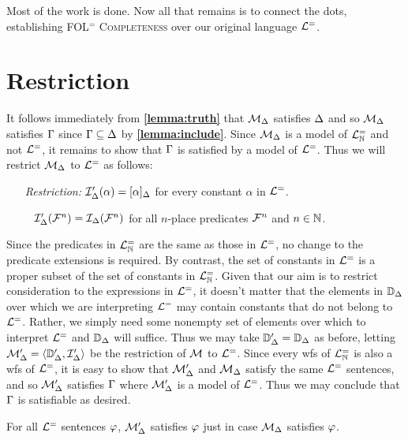 Most of the work is done.
Now all that remains is to connect the dots, establishing \textsc{FOL$^=$ Completeness} over our original language $\mathcal{L}^{=}$.




\section{Restriction}%
  \label{sub:Restriction}
 
It follows immediately from \textbf{\ref{lemma:truth}} that $\mathcal{M}_{\Delta}$ satisfies $\Delta$ and so $\mathcal{M}_{\Delta}$ satisfies $\Gamma$ since $\Gamma\subseteq\Delta$ by \textbf{\ref{lemma:include}}. 
Since $\mathcal{M}_{\Delta}$ is a model of $\mathcal{L}^{=}_{\mathbb{N}}$ and not $\mathcal{L}^{=}$, it remains to show that $\Gamma$ is satisfied by a model of $\mathcal{L}^{=}$.
Thus we will restrict $\mathcal{M}_{\Delta}$ to $\mathcal{L}^{=}$ as follows: 
  \begin{enumerate}[leftmargin=1.5in]
    \item[\it Restriction:] $\mathcal{I}'_{\Delta}(\alpha)=[\alpha]_{\Delta}$ for every constant $\alpha$ in $\mathcal{L}^{=}$.
    \item[~] $\mathcal{I}'_{\Delta}(\mathcal{F}^n)=\mathcal{I}_{\Delta}(\mathcal{F}^n)$ for all $n$-place predicates $\mathcal{F}^n$ and $n\in\mathbb{N}$. 
  \end{enumerate}
Since the predicates in $\mathcal{L}^{=}_{\mathbb{N}}$ are the same as those in $\mathcal{L}^{=}$, no change to the predicate extensions is required.
By contrast, the set of constants in $\mathcal{L}^{=}$ is a proper subset of the set of constants in $\mathcal{L}^{=}_{\mathbb{N}}$. 
Given that our aim is to restrict consideration to the expressions in $\mathcal{L}^{=}$, it doesn't matter that the elements in $\mathbb{D}_{\Delta}$ over which we are interpreting $\mathcal{L}^{=}$ may contain constants that do not belong to $\mathcal{L}^{=}$.
Rather, we simply need some nonempty set of elements over which to interpret $\mathcal{L}^{=}$ and $\mathbb{D}_{\Delta}$ will suffice. 
Thus we may take $\mathbb{D}'_{\Delta}=\mathbb{D}_{\Delta}$ as before, letting $\mathcal{M}'_{\Delta}=\langle\mathbb{D}'_{\Delta},\mathcal{I}'_{\Delta}\rangle$ be the restriction of $\mathcal{M}$ to $\mathcal{L}^{=}$. 
Since every wfs of $\mathcal{L}^{=}_{\mathbb{N}}$ is also a wfs of $\mathcal{L}^{=}$, it is easy to show that $\mathcal{M}'_{\Delta}$ and $\mathcal{M}_{\Delta}$ satisfy the same $\mathcal{L}^{=}$ sentences, and so $\mathcal{M}'_{\Delta}$ satisfies $\Gamma$ where $\mathcal{M}'_{\Delta}$ is a model of $\mathcal{L}^{=}$. 
Thus we may conclude that $\Gamma$ is satisfiable as desired. 

\begin{Lthm} \label{lemma:satrest}
  For all $\mathcal{L}^{=}$ sentences $\varphi$, $\mathcal{M}'_{\Delta}$ satisfies $\varphi$ just in case $\mathcal{M}_{\Delta}$ satisfies $\varphi$.
\end{Lthm}

